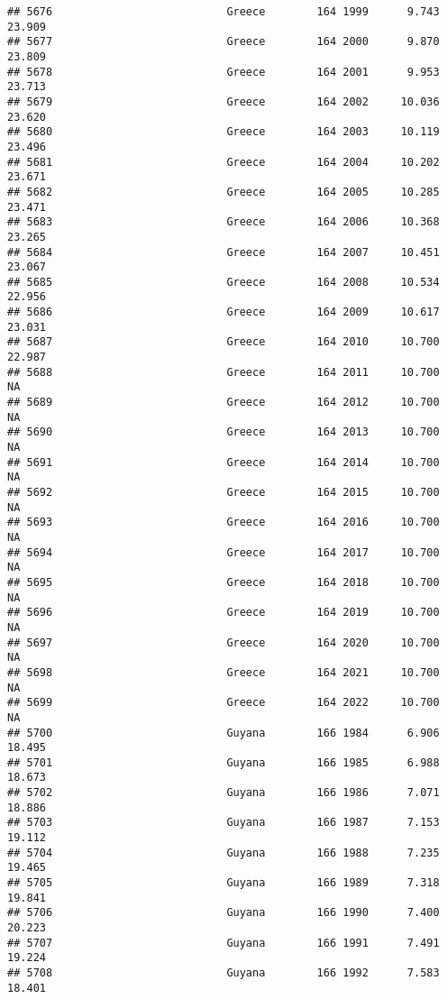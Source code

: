 \documentclass[
]{article}
\begin{document}
\begin{verbatim}
## 5676                           Greece        164 1999      9.743     23.909
## 5677                           Greece        164 2000      9.870     23.809
## 5678                           Greece        164 2001      9.953     23.713
## 5679                           Greece        164 2002     10.036     23.620
## 5680                           Greece        164 2003     10.119     23.496
## 5681                           Greece        164 2004     10.202     23.671
## 5682                           Greece        164 2005     10.285     23.471
## 5683                           Greece        164 2006     10.368     23.265
## 5684                           Greece        164 2007     10.451     23.067
## 5685                           Greece        164 2008     10.534     22.956
## 5686                           Greece        164 2009     10.617     23.031
## 5687                           Greece        164 2010     10.700     22.987
## 5688                           Greece        164 2011     10.700         NA
## 5689                           Greece        164 2012     10.700         NA
## 5690                           Greece        164 2013     10.700         NA
## 5691                           Greece        164 2014     10.700         NA
## 5692                           Greece        164 2015     10.700         NA
## 5693                           Greece        164 2016     10.700         NA
## 5694                           Greece        164 2017     10.700         NA
## 5695                           Greece        164 2018     10.700         NA
## 5696                           Greece        164 2019     10.700         NA
## 5697                           Greece        164 2020     10.700         NA
## 5698                           Greece        164 2021     10.700         NA
## 5699                           Greece        164 2022     10.700         NA
## 5700                           Guyana        166 1984      6.906     18.495
## 5701                           Guyana        166 1985      6.988     18.673
## 5702                           Guyana        166 1986      7.071     18.886
## 5703                           Guyana        166 1987      7.153     19.112
## 5704                           Guyana        166 1988      7.235     19.465
## 5705                           Guyana        166 1989      7.318     19.841
## 5706                           Guyana        166 1990      7.400     20.223
## 5707                           Guyana        166 1991      7.491     19.224
## 5708                           Guyana        166 1992      7.583     18.401

\end{verbatim}
\end{document}
